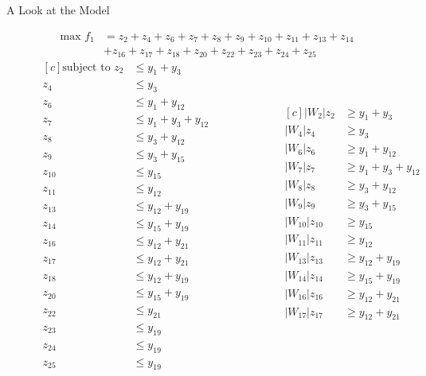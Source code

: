 \documentclass[12pt]{pom_thesis}
\theoremstyle{definition}
\begin{document}
\begin{chapter}{A Look at the Model}
\begin{figure}
		\begin{align*}
		\textrm{max } f_1 &= z_2 + z_4 + z_6 + z_7 + z_8 + z_9 + z_{10} + z_{11} + z_{13} + z_{14} \\
		&+ z_{16} + z_{17} + z_{18} + z_{20} + z_{22} + z_{23} + z_{24} + z_{25}
		\end{align*}
	\begin{equation*}
	\begin{aligned}[c]
	\textrm{subject to } z_2 &\leq y_1 + y_3 \\
	z_4 &\leq y_3\\
	z_6 &\leq y_1 + y_{12}\\
	z_7 &\leq y_1 + y_3 +y_{12}\\
	z_8 &\leq y_3 + y_{12} \\
	z_9 &\leq  y_3 + y_{15} \\
	z_{10} &\leq y_{15} \\
	z_{11} &\leq y_{12} \\
	z_{13} &\leq y_{12} + y_{19} \\
	z_{14} &\leq y_{15} + y_{19} \\
	z_{16} &\leq y_{12} + y_{21} \\
	z_{17} &\leq y_{12} + y_{21} \\
	z_{18} &\leq y_{12} + y_{19} \\
	z_{20} &\leq y_{15} + y_{19} \\
	z_{22} &\leq y_{21} \\
	z_{23} &\leq y_{19} \\
	z_{24} &\leq y_{19} \\
	z_{25} &\leq y_{19} 
	\end{aligned}
	\qquad \qquad \qquad
	\begin{aligned}[c]
	|W_2|z_2 &\geq y_1 + y_3 \\
	|W_4|z_4 &\geq y_3 \\
	|W_6|z_6 &\geq y_1 + y_{12} \\
	|W_7|z_7 &\geq y_1 + y_3 + y_{12} \\
	|W_8|z_8 &\geq y_3 + y_{12} \\
	|W_9|z_9 &\geq y_3 + y_{15} \\
	|W_{10}|z_{10}&\geq y_{15} \\
	|W_{11}|z_{11}&\geq y_{12} \\
	|W_{13}|z_{13}&\geq y_{12} + y_{19} \\
	|W_{14}|z_{14}&\geq y_{15} + y_{19} \\
	|W_{16}|z_{16}&\geq y_{12} + y_{21} \\
	|W_{17}|z_{17}&\geq y_{12} + y_{21} \\

\end{aligned}
\end{equation*}
\end{figure}
\end{chapter}
\end{document}
